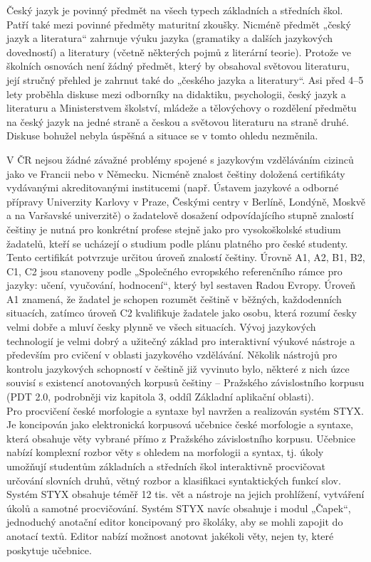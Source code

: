 \documentclass[]{../../metanetpaper}
\begin{document}
\begin{multicols}{2}
Český jazyk je povinný předmět na všech typech základních a středních škol. Patří také mezi povinné předměty maturitní zkoušky. Nicméně předmět „český jazyk a literatura“ zahrnuje výuku jazyka (gramatiky a dalších jazykových dovedností) a literatury (včetně některých pojmů z literární teorie). Protože ve školních osnovách není žádný předmět, který by obsahoval světovou literaturu, její stručný přehled je zahrnut také do „českého jazyka a literatury“. Asi před 4–5 lety proběhla diskuse mezi odborníky na didaktiku, psychologii, český jazyk a literaturu a Ministerstvem školství, mládeže a tělovýchovy o rozdělení předmětu na český jazyk na jedné straně a českou a světovou literaturu na straně druhé. Diskuse bohužel nebyla úspěšná a situace se v tomto ohledu nezměnila.

V ČR nejsou žádné závažné problémy spojené s jazykovým vzděláváním cizinců jako ve Francii nebo v Německu. Nicméně znalost češtiny doložená certifikáty vydávanými akreditovanými institucemi (např. Ústavem jazykové a odborné přípravy Univerzity Karlovy v Praze, Českými centry v Berlíně, Londýně, Moskvě a na Varšavské univerzitě) o žadatelově dosažení odpovídajícího stupně znalostí češtiny je nutná pro konkrétní profese stejně jako pro vysokoškolské studium žadatelů, kteří se ucházejí o studium podle plánu platného pro české studenty. Tento certifikát potvrzuje určitou úroveň znalostí češtiny. Úrovně A1, A2, B1, B2, C1, C2 jsou stanoveny podle „Společného evropského referenčního rámce pro jazyky: učení, vyučování, hodnocení“, který byl sestaven Radou Evropy.\cite{Note7} Úroveň A1 znamená, že žadatel je schopen rozumět češtině v běžných, každodenních situacích, zatímco úroveň C2 kvalifikuje žadatele jako osobu, která rozumí česky velmi dobře a mluví česky plynně ve všech situacích. Vývoj jazykových technologií je velmi dobrý a užitečný základ pro interaktivní výukové nástroje a především pro cvičení v oblasti jazykového vzdělávání. Několik nástrojů pro kontrolu jazykových schopností v češtině již vyvinuto bylo, některé z nich úzce souvisí s existencí anotovaných korpusů češtiny – Pražského závislostního korpusu (PDT 2.0, podrobněji viz kapitola 3, oddíl Základní aplikační oblasti).\\
Pro procvičení české morfologie a syntaxe byl navržen a realizován systém STYX. Je koncipován jako elektronická korpusová učebnice české morfologie a syntaxe, která obsahuje věty vybrané přímo z Pražského závislostního korpusu. Učebnice nabízí komplexní rozbor věty s ohledem na morfologii a syntax, tj. úkoly umožňují studentům základních a středních škol interaktivně procvičovat určování slovních druhů, větný rozbor a klasifikaci syntaktických funkcí slov. Systém STYX obsahuje téměř 12 tis. vět a nástroje na jejich prohlížení, vytváření úkolů a samotné procvičování. Systém STYX navíc obsahuje i  modul „Čapek“, jednoduchý anotační editor koncipovaný pro školáky, aby se mohli zapojit do anotací textů. Editor nabízí možnost anotovat jakékoli věty, nejen ty, které poskytuje učebnice.\cite{Note8}\\

\end{multicols}
\end{document}
